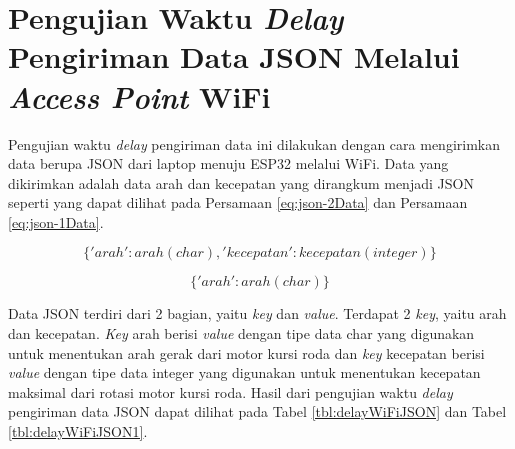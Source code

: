 \section{Pengujian Waktu \emph{Delay} Pengiriman Data JSON Melalui \emph{Access Point} WiFi}
\label{sec:delayWiFiJSON}

Pengujian waktu \emph{delay} pengiriman data ini dilakukan dengan cara mengirimkan data berupa JSON dari laptop menuju ESP32 melalui WiFi. Data yang dikirimkan adalah data arah dan kecepatan yang dirangkum menjadi JSON seperti yang dapat dilihat pada Persamaan \ref{eq:json-2Data} dan Persamaan \ref{eq:json-1Data}. 

\begin{equation}
  \label{eq:json-2Data}
    \{'arah': arah(char), 'kecepatan': kecepatan(integer)\}
\end{equation}

\begin{equation}
  \label{eq:json-1Data}
    \{'arah': arah(char)\}
\end{equation}

Data JSON terdiri dari 2 bagian, yaitu \emph{key} dan \emph{value}. Terdapat 2 \emph{key}, yaitu arah dan kecepatan. \emph{Key} arah berisi \emph{value} dengan tipe data char yang digunakan untuk menentukan arah gerak dari motor kursi roda dan \emph{key} kecepatan berisi \emph{value} dengan tipe data integer yang digunakan untuk menentukan kecepatan maksimal dari rotasi motor kursi roda. Hasil dari pengujian waktu \emph{delay} pengiriman data JSON dapat dilihat pada Tabel \ref{tbl:delayWiFiJSON} dan Tabel \ref{tbl:delayWiFiJSON1}.

